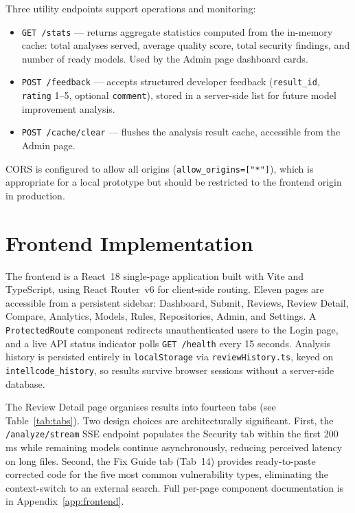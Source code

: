 \documentclass[12pt, oneside]{report}
\begin{document}
Three utility endpoints support operations and monitoring:

\begin{itemize}
  \item \texttt{GET /stats} — returns aggregate statistics computed from the in-memory
    cache: total analyses served, average quality score, total security findings, and
    number of ready models. Used by the Admin page dashboard cards.
  \item \texttt{POST /feedback} — accepts structured developer feedback
    (\texttt{result\_id}, \texttt{rating} 1--5, optional \texttt{comment}), stored in
    a server-side list for future model improvement analysis.
  \item \texttt{POST /cache/clear} — flushes the analysis result cache, accessible from
    the Admin page.
\end{itemize}

\ac{CORS} is configured to allow all origins (\texttt{allow\_origins=["*"]}), which is
appropriate for a local prototype but should be restricted to the frontend origin in
production.

\section{Frontend Implementation}
\label{sec:frontend}

The frontend is a React~18 single-page application built with Vite and TypeScript,
using React Router~v6 for client-side routing. Eleven pages are accessible from a
persistent sidebar: Dashboard, Submit, Reviews, Review Detail, Compare, Analytics,
Models, Rules, Repositories, Admin, and Settings. A \texttt{ProtectedRoute} component
redirects unauthenticated users to the Login page, and a live API status indicator
polls \texttt{GET /health} every 15 seconds. Analysis history is persisted entirely in
\texttt{localStorage} via \texttt{reviewHistory.ts}, keyed on \texttt{intellcode\_history},
so results survive browser sessions without a server-side database.

The Review Detail page organises results into fourteen tabs (see
Table~\ref{tab:tabs}). Two design choices are architecturally significant. First,
the \texttt{/analyze/stream} SSE endpoint populates the Security tab within the first
200\,ms while remaining models continue asynchronously, reducing perceived latency on
long files. Second, the Fix Guide tab (Tab~14) provides ready-to-paste corrected code
for the five most common vulnerability types, eliminating the context-switch to an
external search. Full per-page component documentation is in
Appendix~\ref{app:frontend}.
\end{document}
